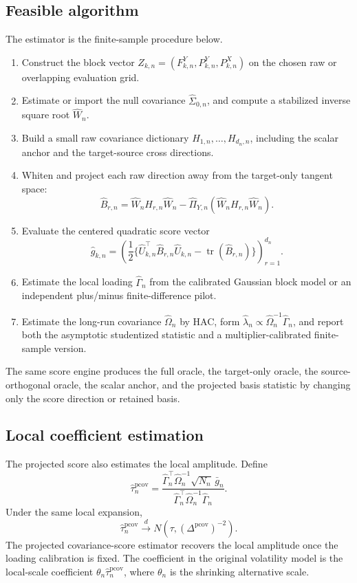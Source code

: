 \documentclass[11pt,a4paper]{amsart}
\theoremstyle{plain}
\theoremstyle{definition}
\theoremstyle{remark}
\DeclareMathOperator{\tr}{tr}
\newcommand{\toD}{\xrightarrow{d}}
\begin{document}
\subsection{Feasible algorithm}

The estimator is the finite-sample procedure below.
\begin{enumerate}[label=(\arabic*)]
\item Construct the block vector \(Z_{k,n}=(F_{k,n}^{Y},P_{k,n}^{Y},P_{k,n}^{X})\) on the chosen
raw or overlapping evaluation grid.
\item Estimate or import the null covariance \(\widehat\Sigma_{0,n}\), and compute a stabilized
inverse square root \(\widehat W_n\).
\item Build a small raw covariance dictionary \(H_{1,n},\dots,H_{d_n,n}\), including the scalar
anchor and the target-source cross directions.
\item Whiten and project each raw direction away from the target-only tangent space:
\[
        \widehat B_{r,n}
        =
        \widehat W_nH_{r,n}\widehat W_n
        -
        \widehat\Pi_{Y,n}(\widehat W_nH_{r,n}\widehat W_n).
\]
\item Evaluate the centered quadratic score vector
\[
        \widehat g_{k,n}
        =
        \left(
        \frac12\{\widehat U_{k,n}^{\top}\widehat B_{r,n}\widehat U_{k,n}
        -\tr(\widehat B_{r,n})\}
        \right)_{r=1}^{d_n}.
\]
\item Estimate the local loading \(\widehat\Gamma_n\) from the calibrated Gaussian block model or an
independent plus/minus finite-difference pilot.
\item Estimate the long-run covariance \(\widehat\Omega_n\) by HAC, form
\(\widehat\lambda_n\propto\widehat\Omega_n^{-1}\widehat\Gamma_n\), and report both the asymptotic
studentized statistic and a multiplier-calibrated finite-sample version.
\end{enumerate}

The same score engine produces the full oracle, the target-only oracle, the
source-orthogonal oracle, the scalar anchor, and the projected basis statistic by changing only the
score direction or retained basis.

\subsection{Local coefficient estimation}

The projected score also estimates the local amplitude.  Define
\[
        \widehat\tau_n^{\mathrm{pcov}}
        =
        \frac{
        \widehat\Gamma_n^\top
        \widehat\Omega_n^{-1}
        \sqrt{N_n}\,\bar g_n
        }{
        \widehat\Gamma_n^\top
        \widehat\Omega_n^{-1}
        \widehat\Gamma_n
        }.
\]
Under the same local expansion,
\[
        \widehat\tau_n^{\mathrm{pcov}}
        \toD
        N
        \left(
        \tau,
        (\Delta^{\mathrm{pcov}})^{-2}
        \right).
\]
The projected covariance-score estimator recovers the local amplitude once the loading calibration
is fixed.  The coefficient in the original volatility model is the local-scale coefficient
\(\theta_n\widehat\tau_n^{\mathrm{pcov}}\), where \(\theta_n\) is the shrinking alternative scale.
\end{document}
